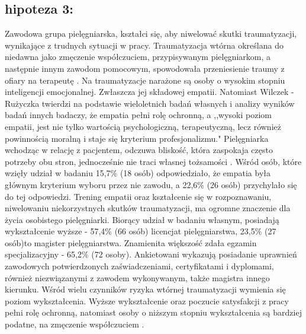\documentclass[a4paper,12pt,twoside,openright]{mwrep}
\begin{document}
\subsection*{hipoteza 3:} 

Zawodowa grupa pielęgniarska, kształci się, aby niwelować skutki traumatyzacji, wynikające z trudnych sytuacji w pracy. Traumatyzacja wtórna określana do niedawna jako zmęczenie współczuciem, przypisywanym pielęgniarkom, a następnie innym zawodom pomocowym, spowodowała przeniesienie traumy z ofiary na terapeutę \cite{figley}. Na traumatyzacje narażone są osoby o wysokim stopniu inteligencji emocjonalnej. Zwłaszcza jej składowej empatii. Natomiast Wilczek - Rużyczka twierdzi na podstawie wieloletnich badań własnych i analizy wyników badań innych badaczy, że empatia pełni rolę ochronną, a ,,wysoki poziom empatii, jest nie tylko wartością psychologiczną, terapeutyczną, lecz również powinnością moralną i staje się kryterium profesjonalizmu."  Pielęgniarka wchodząc w relację z pacjentem, odczuwa bliskość, która zaspokaja często potrzeby obu stron, jednocześnie nie traci własnej tożsamości \cite{wilczek}. Wśród osób, które wzięły udział w badaniu  15,7\% (18 osób) odpowiedziało, że empatia była głównym kryterium wyboru przez nie zawodu, a 22,6\% (26 osób) przychylało się do tej odpowiedzi. Trening empatii oraz kształcenie się w  rozpoznawaniu, niwelowaniu niekorzystnych skutków traumatyzacji,  ma ogromne znaczenie dla życia osobistego pielęgniarki. Biorący udział w badaniu własnym,  posiadają wykształcenie wyższe - 57,4\% (66 osób) licencjat pielęgniarstwa,  23,5\% (27 osób)to magister pielęgniarstwa. Znamienita większość zdała egzamin specjalizacyjny - 65,2\% (72 osoby). Ankietowani wykazują posiadanie uprawnień zawodowych potwierdzonych zaświadczeniami, certyfikatami i dyplomami, również niezwiązanymi z zawodem wykonywanym, także magistra innego kierunku. Wśród wielu czynników ryzyka wtórnej traumatyzacji wymienia się poziom wykształcenia. Wyższe wykształcenie oraz poczucie satysfakcji z pracy pełni rolę ochronną, natomiast osoby o niższym stopniu wykształcenia są bardziej podatne, na zmęczenie współczuciem \cite{oginska}.
\end{document}
